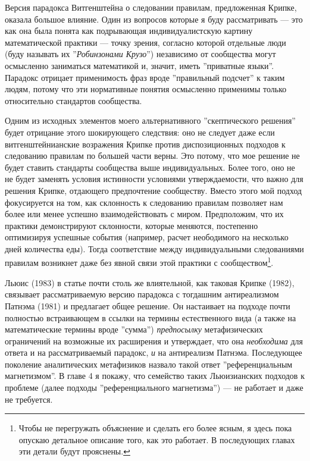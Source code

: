 \documentclass[11pt]{book}
\begin{document}
Версия парадокса Витгенштейна о следовании правилам, предложенная Крипке, оказала большое влияние. Один из вопросов которые я буду рассматривать --- это как она была понята как подрывающая индивидуалистскую картину математической практики --- точку зрения, согласно которой отдельные люди (буду называть их ''\textit{Робинзонами Крузо}'') независимо от сообщества могут осмысленно заниматься математикой и, значит, иметь ''приватные языки''. Парадокс отрицает применимость фраз вроде ''правильный подсчет'' к таким людям, потому что эти нормативные понятия осмысленно применимы только относительно стандартов сообщества.

Одним из исходных элементов моего альтернативного ''скептического решения'' будет отрицание этого шокирующего следствия: оно не следует даже если витгенштейнианские возражения Крипке против диспозиционных подходов к следованию правилам по большей части верны. Это потому, что мое решение не будет ставить стандарты сообщества выше индивидуальных. Более того, оно не не будет заменять условия истинности условиями утверждаемости, что важно для решения Крипке, отдающего предпочтение сообществу. Вместо этого мой подход фокусируется на том, как склонность к следованию правилам позволяет нам более или менее успешно взаимодействовать с миром. Предположим, что их практики демонстрируют склонности, которые меняются, постепенно оптимизируя успешные события (например, расчет неободимого на несколько дней количества еды). Тогда соответствие между индивидуальными следованиями правилам возникнет даже без явной связи этой практики с сообществом\footnote{Чтобы не перегружать объяснение и сделать его более ясным, я здесь пока опускаю детальное описание того, как это работает. В последующих главах эти детали будут прояснены.}.

Льюис (1983) в статье почти столь же влиятельной, как таковая Крипке (1982), связывает рассматриваемую версию парадокса с тогдашним антиреализмом Патнэма (1981) и предлагает общее решение. Он настаивает на подходе почти полностью встраивающем в ссылки на термины естественного вида (а также на математические термины вроде ''сумма'') \textit{предпосылку} метафизических ограничений на возможные их расширения и утверждает, что она \textit{необходима} для ответа и на рассматриваемый парадокс, \textit{и} на антиреализм Патнэма. Последующее поколение аналитических метафизиков назвало такой ответ ''референциальным магнетизмом''. В главе 4 я покажу, что семейство таких Льюизианских подходов к проблеме (далее подходы ''референциального магнетизма'') --- не работает и даже не требуется.
\end{document}
